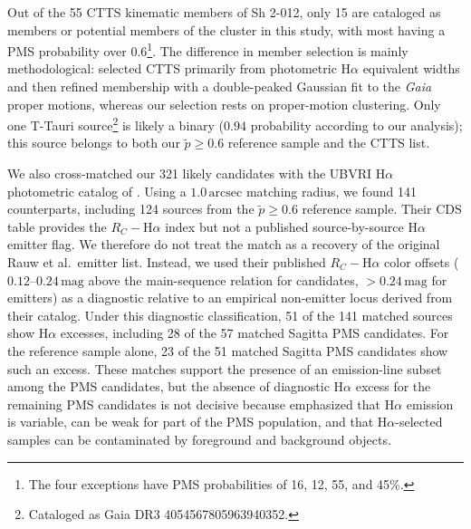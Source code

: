 \documentclass{aa}
\begin{document}
Out of the 55 CTTS kinematic members of Sh 2-012, only 15 are cataloged as members or potential members of the cluster in this study, with most having a PMS probability over $0.6$\footnote{The four exceptions have PMS probabilities of 16, 12, 55, and 45\%.}. The difference in member selection is mainly methodological: \citet{2019MNRAS.484.5102K} selected CTTS primarily from photometric H$\alpha$ equivalent widths and then refined membership with a double-peaked Gaussian fit to the \textit{Gaia} proper motions, whereas our selection rests on proper-motion clustering. Only one T-Tauri source\footnote{Cataloged as Gaia DR3 4054567805963940352.} is likely a binary ($0.94$ probability according to our analysis); this source belongs to both our $\tilde{p}\geq0.6$ reference sample and the \citet{2019MNRAS.484.5102K} CTTS list.

We also cross-matched our 321 likely candidates with the UBVRI H$\alpha$ photometric catalog of \citet{2010AA...511A..25R}. Using a $1.0\,\mathrm{arcsec}$ matching radius, we found 141 counterparts, including 124 sources from the $\tilde{p}\geq0.6$ reference sample. Their CDS table provides the $R_C-$H$\alpha$ index but not a published source-by-source H$\alpha$ emitter flag. We therefore do not treat the match as a recovery of the original Rauw et al.\ emitter list. Instead, we used their published $R_C-$H$\alpha$ color offsets ($0.12$--$0.24\,\mathrm{mag}$ above the main-sequence relation for candidates, $>0.24\,\mathrm{mag}$ for emitters) as a diagnostic relative to an empirical non-emitter locus derived from their catalog. Under this diagnostic classification, 51 of the 141 matched sources show H$\alpha$ excesses, including 28 of the 57 matched Sagitta PMS candidates. For the reference sample alone, 23 of the 51 matched Sagitta PMS candidates show such an excess. These matches support the presence of an emission-line subset among the PMS candidates, but the absence of diagnostic H$\alpha$ excess for the remaining PMS candidates is not decisive because \citet{2010AA...511A..25R} emphasized that H$\alpha$ emission is variable, can be weak for part of the PMS population, and that H$\alpha$-selected samples can be contaminated by foreground and background objects.
\end{document}

